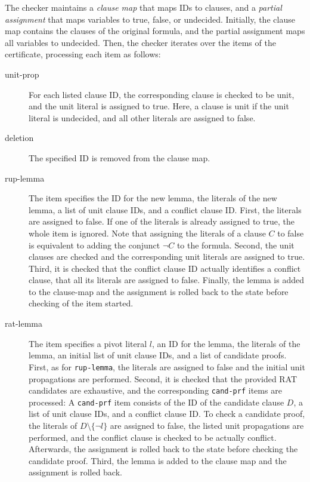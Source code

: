 \documentclass{llncs}
\newcommand{\lsti}{\lstinline[language={},literate={}]}
\begin{document}
The checker maintains a \emph{clause map} that maps IDs to clauses, and a \emph{partial assignment} that maps variables to true, false, or undecided.
Initially, the clause map contains the clauses of the original formula, and the partial assignment maps all variables to undecided.
Then, the checker iterates over the items of the certificate, processing each item as follows:
\begin{description}
  \item[unit-prop] 
    For each listed clause ID, the corresponding clause is checked to be unit, and the unit literal is assigned to true.
    Here, a clause is unit if the unit literal is undecided, and all other literals are assigned to false.
  \item[deletion] The specified ID is removed from the clause map.
  \item[rup-lemma] The item specifies the ID for the new lemma, the literals of the new lemma, a list of unit clause IDs, and a conflict clause ID.
      First, the literals are assigned to false. If one of the literals is already assigned to true, the whole item is ignored.
        Note that assigning the literals of a clause $C$ to false is equivalent to adding the conjunct $\neg C$ to the formula. 
      Second, the unit clauses are checked and the corresponding unit literals are assigned to true.
      Third, it is checked that the conflict clause ID actually identifies a conflict clause, \ie that all its literals are assigned to false.
      Finally, the lemma is added to the clause-map and the assignment is rolled back to the state before checking of the item started.
    \item[rat-lemma] The item specifies a pivot literal $l$, an ID for the lemma, the literals of the lemma, an initial list of unit clause IDs, and a list of
      candidate proofs. 
      First, as for \lsti{rup-lemma}, the literals are assigned to false and the initial unit propagations are performed. 
      Second, it is checked that the provided RAT candidates are exhaustive, and the corresponding \lsti{cand-prf} items are processed:
      A \lsti{cand-prf} item consists of the ID of the candidate clause $D$, a list of unit clause IDs, and a conflict clause ID.
      To check a candidate proof, the literals of $D\setminus\{\neg l\}$ are assigned to false, the listed unit propagations are performed, and the conflict clause is 
      checked to be actually conflict. Afterwards, the assignment is rolled back to the state before checking the candidate proof.
      Third, the lemma is added to the clause map and the assignment is rolled back.


\end{description}
\end{document}
